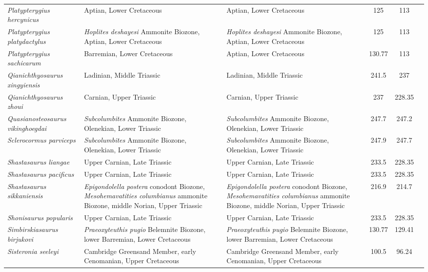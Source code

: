\begin{longtabu}{>{\itshape}lXXSSl}
	Platypterygius hercynicus & Aptian, Lower Cretaceous & Aptian, Lower Cretaceous & 125 & 113 & \cite{Kolb2009} \\
	Platypterygius platydactylus & \emph{Hoplites deshayesi} Ammonite Biozone, Aptian, Lower Cretaceous & \emph{Hoplites deshayesi} Ammonite Biozone, Aptian, Lower Cretaceous & 125 & 113 & \cite{Broili1908} \\
	Platypterygius sachicarum & Barremian, Lower Cretaceous & Aptian, Lower Cretaceous & 130.77 & 113 & \cite{Paramo1997} \\
	Qianichthyosaurus xingyiensis & Ladinian, Middle Triassic & Ladinian, Middle Triassic & 241.5 & 237 & \cite{Yang2013} \\
	Qianichthyosaurus zhoui & Carnian, Upper Triassic & Carnian, Upper Triassic & 237 & 228.35 & \cite{Li1999} \\
	Quasianosteosaurus vikinghoegdai & \emph{Subcolumbites} Ammonite Biozone, Olenekian, Lower Triassic & \emph{Subcolumbites} Ammonite Biozone, Olenekian, Lower Triassic & 247.7 & 247.2 & \cite{Maisch2003c} \\
	Sclerocormus parviceps & \emph{Subcolumbites} Ammonite Biozone, Olenekian, Lower Triassic & \emph{Subcolumbites} Ammonite Biozone, Olenekian, Lower Triassic & 247.9 & 247.7 & \cite{Jiang2016,Motani2017} \\
	Shastasaurus liangae & Upper Carnian, Late Triassic & Upper Carnian, Late Triassic & 233.5 & 228.35 & \cite{Yin2000} \\
	Shastasaurus pacificus & Upper Carnian, Late Triassic & Upper Carnian, Late Triassic & 233.5 & 228.35 & \cite{Merriam1908} \\
	Shastasaurus sikkaniensis & \emph{Epigondolella postera} conodont Biozone, \emph{Mesohemavatities columbianus} ammonite Biozone, middle Norian, Upper Triassic & \emph{Epigondolella postera} conodont Biozone, \emph{Mesohemavatities columbianus} ammonite Biozone, middle Norian, Upper Triassic & 216.9 & 214.7 & \cite{Nicholls2004} \\
	Shonisaurus popularis & Upper Carnian, Late Triassic & Upper Carnian, Late Triassic & 233.5 & 228.35 & \cite{Camp1980} \\
	Simbirskiasaurus birjukovi & \emph{Praeoxyteuthis pugio} Belemnite Biozone, lower Barremian, Lower Cretaceous & \emph{Praeoxyteuthis pugio} Belemnite Biozone, lower Barremian, Lower Cretaceous & 130.77 & 129.41 & \cite{Fischer2014b} \\
	Sisteronia seeleyi & Cambridge Greensand Member, early Cenomanian, Upper Cretaceous & Cambridge Greensand Member, early Cenomanian, Upper Cretaceous & 100.5 & 96.24 & \cite{Fischer2014a} \\

\end{longtabu}
